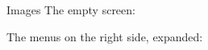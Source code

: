 \documentclass{article}
\begin{document}
\pagebreak
\begin{section}{Images}
The empty screen:

\hspace{-1.5cm}


The menus on the right side, expanded:


\end{section}
\end{document}
